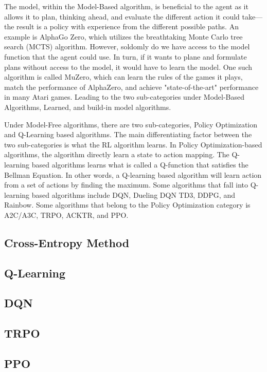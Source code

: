 \documentclass{article}
\begin{document}
The model, within the Model-Based algorithm, is beneficial to the agent as it allows it to plan, thinking ahead, and evaluate the different action it could take—the result is a policy with experience from the different possible paths. An example is AlphaGo Zero, which utilizes the breathtaking Monte Carlo tree search (MCTS) algorithm. However, soldomly do we have access to the model function that the agent could use. In turn, if it wants to plane and formulate plans without access to the model, it would have to learn the model. One such algorithm is called MuZero, which can learn the rules of the games it plays, match the performance of AlphaZero, and achieve "state-of-the-art" performance in many Atari games. Leading to the two sub-categories under Model-Based Algorithms, Learned, and build-in model algorithms.

Under Model-Free algorithms, there are two sub-categories, Policy Optimization and Q-Learning based algorithms. The main differentiating factor between the two sub-categories is what the RL algorithm learns. In Policy Optimization-based algorithms, the algorithm directly learn a state to action mapping. The Q-learning based algorithms learns what is called a Q-function that satisfies the Bellman Equation. In other words, a Q-learning based algorithm will learn action from a set of actions by finding the maximum. Some algorithms that fall into Q-learning based algorithms include DQN, Dueling DQN TD3, DDPG, and Rainbow. Some algorithms that belong to the Policy Optimization category is A2C/A3C, TRPO, ACKTR, and PPO. 

\subsection{Cross-Entropy Method}

\subsection{Q-Learning}

\subsection{DQN}

\subsection{TRPO}

\subsection{PPO}
\end{document}
